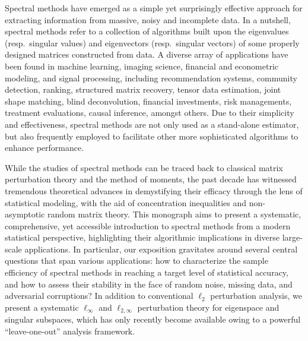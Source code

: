 
Spectral methods have emerged as a simple yet surprisingly effective approach for extracting information from massive, noisy and incomplete data. In a nutshell, spectral methods refer to a collection of algorithms built upon the eigenvalues (resp.~singular values) and eigenvectors (resp.~singular vectors) of some properly designed  matrices constructed from data. A diverse array of applications have been found in machine learning, imaging science, financial and econometric modeling, and signal processing, including recommendation systems, community detection, ranking, structured matrix recovery, tensor data estimation, joint shape matching, blind deconvolution, financial investments, risk managements,  treatment evaluations, causal inference, amongst others. Due to their simplicity and effectiveness, spectral methods are not only used  as a stand-alone estimator, but also frequently employed to facilitate other more sophisticated algorithms to enhance performance.


While the studies of spectral methods can be traced back to classical matrix perturbation theory and the method of moments, the past decade has witnessed tremendous theoretical advances in demystifying  their efficacy through the lens of statistical modeling, with the aid of concentration inequalities and non-asymptotic random matrix theory.
This monograph aims to present a systematic, comprehensive, yet accessible introduction to spectral methods from a modern statistical perspective,
highlighting their algorithmic implications in diverse large-scale applications.
In particular, our exposition gravitates around several central questions that span various applications: how to characterize the sample efficiency of spectral methods in reaching a target level of statistical accuracy, and how to assess their stability in the face of random noise, missing data, and adversarial corruptions?
In addition to conventional $\ell_2$ perturbation analysis, we present a systematic $\ell_{\infty}$ and $\ell_{2,\infty}$ perturbation theory for eigenspace and singular subspaces, which has only recently become available owing to a powerful ``leave-one-out'' analysis framework.

